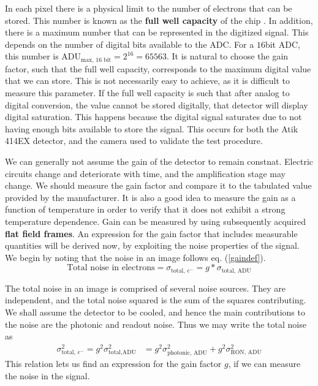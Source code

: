\documentclass[../main.tex]{subfiles}
\begin{document}
	In each pixel there is a physical limit to the number of electrons that can be stored. This number is known as the \textbf{full well capacity} of the chip \cite{handbookofccdastronomy}. In addition, there is a maximum number that can be represented in the digitized signal. This depends on the number of digital bits  available to the ADC. For a $16$bit ADC, this number is $\text{ADU}_{\text{max, 16 bit}} = 2^{16} = 65563$. It is natural to choose the gain factor, such that the full well capacity, corresponds to the maximum digital value that we can store. This is not necessarily easy to achieve, as it is difficult to measure this parameter. If the full well capacity is such that after analog to digital conversion, the value cannot be stored digitally, that detector will display digital saturation. This happens because the digital signal saturates due to not having enough bits available to store the signal. This occurs for both the Atik 414EX detector, and the camera used to validate the test procedure.
	
	We can generally not assume the gain of the detector to remain constnat. Electric circuits change and deteriorate with time, and the amplification stage may change. We should measure the gain factor and compare it to the tabulated value provided by the manufacturer. It is also a good idea to measure the gain as a function of temperature in order to verify that it does not exhibit a strong temperature dependence.
	Gain can be measured by using subsequently acquired \textbf{flat field frames}. An expression for the gain factor that includes measurable quantities will be derived now, by exploiting the noise properties of the signal. We begin by noting that the noise in an image follows eq. (\ref{gaindef}). 
	\begin{equation}
		\text{Total noise in electrons} = \sigma_\text{total, $e^-$} = g * \sigma_\text{total, ADU} 
	\end{equation}
		
	The total noise in an image is comprised of several noise sources. They are independent, and the total noise squared is the sum of the squares contributing. We shall assume the detector to be cooled, and hence the main contributions to the noise are the photonic and readout noise. Thus we may write the total noise as
	\begin{align}\label{totalnoiselec}
		\sigma_\text{total, $e^-$}^2 = g^2\sigma_\text{total,ADU}^2 &= g^2\sigma_\text{photonic, ADU}^2 + g^2\sigma_\text{RON, ADU}^2
	\end{align}
	This relation lets us find an expression for the gain factor $g$, if we can measure the noise in the signal. 
	
\end{document}
